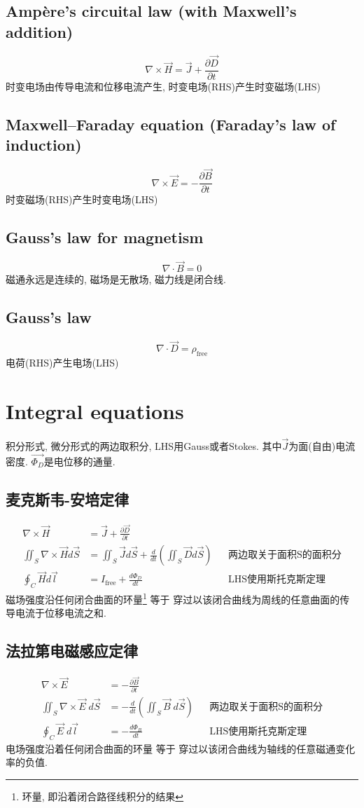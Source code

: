 \documentclass[a4paper]{report}
\begin{document}
\subsection{Ampère's circuital law (with Maxwell's addition)}
$$\nabla\times \vec{H} =\vec{J}+\frac{\partial \vec{D} }{\partial t}$$
时变电场由传导电流和位移电流产生, 时变电场(RHS)产生时变磁场(LHS)
\subsection{Maxwell–Faraday equation (Faraday's law of induction)}
$$\nabla\times \vec{E} =-\frac{\partial \vec{B} }{\partial t}$$
时变磁场(RHS)产生时变电场(LHS)
\subsection{Gauss's law for magnetism}
$$\nabla\cdot \vec{B} =0$$
磁通永远是连续的, 磁场是无散场, 磁力线是闭合线. 
\subsection{Gauss's law}
$$\nabla\cdot \vec{D} =\rho_{\text{free}}$$
电荷(RHS)产生电场(LHS)
\section{Integral equations}
积分形式, 微分形式的两边取积分, LHS用Gauss或者Stokes. 其中$\vec{J}$为面(自由)电流密度. $\vec{\Phi_D}$是电位移的通量. 
\subsection{麦克斯韦-安培定律}
\begin{align*}
    \nabla\times \vec{H} &=\vec{J}+ \frac{\partial \vec{D} }{\partial t}\\
    \iint_S \nabla\times \vec{H} d\vec{S}&=\iint_S \vec{J} d\vec{S}+ \frac{d  }{d t}( \iint_S \vec{D} d\vec{S}) & &\text{两边取关于面积S的面积分}\\
    \oint_C \vec{H} d\vec{l}&=I_{\text{free}}+\frac{d \Phi_D }{d t}&&\text{LHS使用斯托克斯定理}
\end{align*}
磁场强度沿任何闭合曲面的环量\footnote{环量, 即沿着闭合路径线积分的结果} 等于 穿过以该闭合曲线为周线的任意曲面的传导电流于位移电流之和. 
\subsection{法拉第电磁感应定律}
\begin{align*}
    \nabla\times \vec{E} &=-\frac{\partial \vec{B} }{\partial t}\\
    \iint_S\nabla\times \vec{E} \;d\vec{S}  &=- \frac{d }{d t} (\iint_S \vec{B} \; d\vec{S})&&\text{两边取关于面积S的面积分}\\
    \oint_C \vec{E} \;d\vec{l}&=- \frac{d \Phi_B }{d t}&&\text{LHS使用斯托克斯定理}
\end{align*}
电场强度沿着任何闭合曲面的环量 等于 穿过以该闭合曲线为轴线的任意磁通变化率的负值. 
\end{document}
